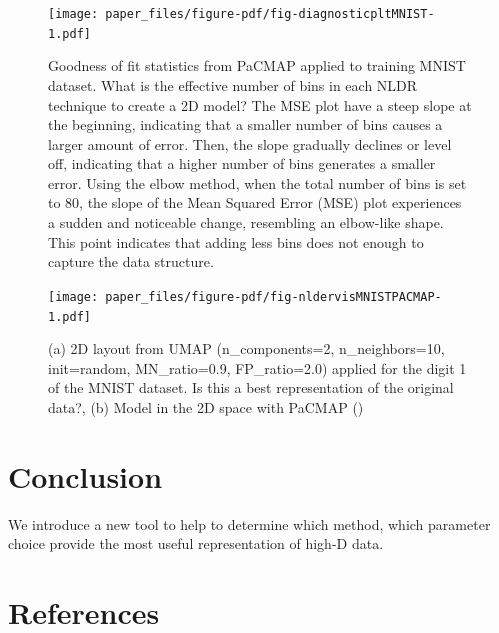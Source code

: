 \documentclass[
  12pt]{article}
\begin{document}
\begin{figure}

{\centering \texttt{[image: paper\_files/figure-pdf/fig-diagnosticpltMNIST-1.pdf]}

}

\caption{\label{fig-diagnosticpltMNIST}Goodness of fit statistics from
PaCMAP applied to training MNIST dataset. What is the effective number
of bins in each NLDR technique to create a 2D model? The MSE plot have a
steep slope at the beginning, indicating that a smaller number of bins
causes a larger amount of error. Then, the slope gradually declines or
level off, indicating that a higher number of bins generates a smaller
error. Using the elbow method, when the total number of bins is set to
80, the slope of the Mean Squared Error (MSE) plot experiences a sudden
and noticeable change, resembling an elbow-like shape. This point
indicates that adding less bins does not enough to capture the data
structure.}

\end{figure}

\begin{figure}[h]

{\centering \texttt{[image: paper\_files/figure-pdf/fig-nldervisMNISTPACMAP-1.pdf]}

}

\caption{\label{fig-nldervisMNISTPACMAP}(a) 2D layout from UMAP
(n\_components=2, n\_neighbors=10, init=random, MN\_ratio=0.9,
FP\_ratio=2.0) applied for the digit 1 of the MNIST dataset. Is this a
best representation of the original data?, (b) Model in the 2D space
with PaCMAP ()}

\end{figure}

\hypertarget{sec-conclusion}{%
\section{Conclusion}\label{sec-conclusion}}

We introduce a new tool to help to determine which method, which
parameter choice provide the most useful representation of high-D data.

\hypertarget{references}{%
\section*{References}\label{references}}

\renewcommand{\bibsection}{}


\newpage{}
\end{document}
